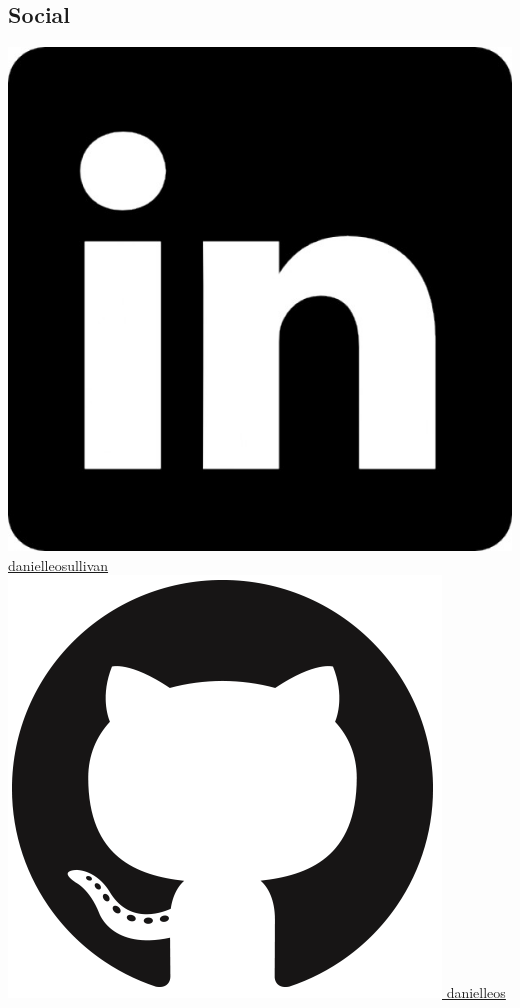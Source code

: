 \documentclass[]{friggeri-cv}
\begin{document}
\begin{aside}
    \section{Social}
        \href{https://www.linkedin.com/in/danielleosullivan}{\includegraphics[scale=0.015]{img/linkedin.jpg} danielleosullivan}
        \href{https://github.com/danielleos}{\includegraphics[scale=0.025]{img/github.png} danielleos}
    ~

\end{aside}
\end{document}
